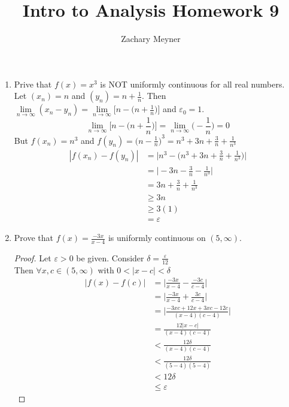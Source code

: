 \documentclass[12pt]{article}
\title{\large Intro to Analysis Homework 9}
\author{\large Zachary Meyner}
\date{}
\begin{document}
\maketitle

\begin{enumerate}
    \item Prive that $f(x) = x^3$ is NOT uniformly continuous for all real numbers. \\
    Let $(x_n) = n$ and $(y_n) = n + \frac{1}{n}$. Then $\lim\limits_{n \to \infty} (x_n-y_n) = \lim\limits_{n \to \infty} \big[n - \big(n + \frac{1}{n} \big) \big]$ and $\varepsilon_{0} = 1$. 
    \[\lim\limits_{n \to \infty} \bigg[n - \bigg(n + \frac{1}{n} \bigg) \bigg] = \lim\limits_{n \to \infty} \bigg( - \frac{1}{n} \bigg) = 0\]
    But $f(x_n) = n^3$ and $f(y_n) = {\big(n- \frac{1}{n} \big)}^3 = n^3 + 3n + \frac{3}{n} + \frac{1}{n^{3}}$ 
    \begin{align*}
        |f(x_n) - f(y_n)| &= \bigg| n^3 - \bigg( n^3 + 3n + \frac{3}{n} + \frac{1}{n^{3}} \bigg) \bigg| \\
        &= \bigg| -3n - \frac{3}{n} - \frac{1}{n^{3}} \bigg| \\
        &= 3n + \frac{3}{n} + \frac{1}{n^{3}} \\
        &\geq 3n \\
        &\geq 3(1) \\
        &= \varepsilon
    \end{align*}

    \item Prove that $f(x) = \frac{-3x}{x-4}$ is uniformly continuous on $(5, \infty)$.
    \begin{proof}
        Let $\varepsilon > 0$ be given. Consider $\delta = \frac{\varepsilon}{12}$ \\
        Then $\forall x,c \in (5, \infty)$ with $0 < |x-c| < \delta$
        \begin{align*}
            |f(x) - f(c)| &= \bigg| \frac{-3x}{x-4} - \frac{-3c}{c-4} \bigg| \\
            &= \bigg| \frac{-3x}{x-4} + \frac{3c}{c-4} \bigg| \\
            &= \bigg| \frac{-3xc + 12x + 3xc -12c}{(x-4)(c-4)} \bigg| \\
            &= \frac{12 |x-c|}{(x-4)(c-4)} \\
            &< \frac{12\delta}{(x-4)(c-4)} \\
            &< \frac{12\delta}{(5-4)(5-4)} \\
            &< 12\delta \\
            &\leq \varepsilon
        \end{align*}
    \end{proof}


\end{enumerate}
\end{document}
